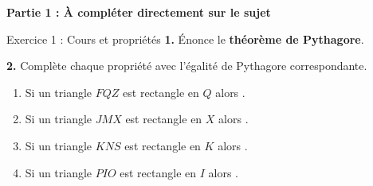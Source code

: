 

\begin{center}
	\Large\textbf{Partie 1 : À compléter directement sur le sujet}
\end{center}
\vspace{2mm}

\begin{exercisebox}{ Exercice 1 : Cours et propriétés }
	\textbf{1.} Énonce le \textbf{théorème de Pythagore}. 
	
	
	\smallspace
	
	\textbf{2.} Complète chaque propriété avec l’égalité de Pythagore correspondante. 
	\begin{enumerate}[label=\alph*)]
		\item Si un triangle $FQZ$ est rectangle en $Q$ alors\;\onlyeleve{\underline{\hspace{2.2cm}} + \underline{\hspace{2.2cm}} = \underline{\hspace{2.2cm}}} .
		\item Si un triangle $JMX$ est rectangle en $X$ alors\;\onlyeleve{\underline{\hspace{2.2cm}} + \underline{\hspace{2.2cm}} = \underline{\hspace{2.2cm}}} .
		\item Si un triangle $KNS$ est rectangle en $K$ alors\;\onlyeleve{\underline{\hspace{2.2cm}} + \underline{\hspace{2.2cm}} = \underline{\hspace{2.2cm}}} .
		\item Si un triangle $PIO$ est rectangle en $I$ alors\;\onlyeleve{\underline{\hspace{2.2cm}} + \underline{\hspace{2.2cm}} = \underline{\hspace{2.2cm}}} .
	\end{enumerate}
	

\end{exercisebox}

